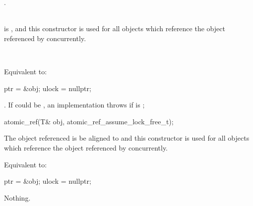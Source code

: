 \begin{itemdescr}
\pnum
{}.
\begin{addedblock}
\expects \\
 is , and this constructor is used for all  objects which 
reference the object referenced by  concurrently.
\end{addedblock}

\pnum
\effects {}\\
\begin{addedblock}Equivalent to:
\begin{codeblock}
  ptr = &obj;
  ulock = nullptr;
\end{codeblock}
\end{addedblock}

\pnum
\throws {}
\begin{addedblock}
\impdefx{}.  If  could be , an implementation
throws  if  is ;
\end{addedblock}
\end{itemdescr}

\begin{addedblock}
\begin{itemdecl}
atomic_ref(T& obj, atomic_ref_assume_lock_free_t);
\end{itemdecl}

\begin{itemdescr}
\pnum
\expects The object referenced  is be aligned to  and
this constructor is used for all  objects which reference the 
object referenced by  concurrently. 

\pnum
\effects Equivalent to:
\begin{codeblock}
  ptr = &obj;
  ulock = nullptr;
\end{codeblock}

\pnum
\throws Nothing.
\end{itemdescr}

\end{addedblock}



